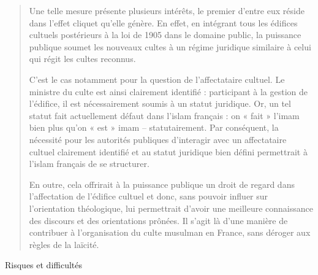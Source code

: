 \begin{quote}
Une telle mesure présente plusieurs intérêts, le premier d'entre eux
réside dans l'effet cliquet qu'elle génère. En effet, en intégrant tous
les édifices cultuels postérieurs à la loi de 1905 dans le domaine
public, la puissance publique soumet les nouveaux cultes à un régime
juridique similaire à celui qui régit les cultes reconnus.

C'est le cas notamment pour la question de l'affectataire cultuel. Le
ministre du culte est ainsi clairement identifié : participant à la
gestion de l'édifice, il est nécessairement soumis à un statut
juridique. Or, un tel statut fait actuellement défaut dans l'islam
français : on « fait » l'imam bien plus qu'on « est » imam --
statutairement. Par conséquent, la nécessité pour les autorités
publiques d'interagir avec un affectataire cultuel clairement identifié
et au statut juridique bien défini permettrait à l'islam français de se
structurer.

En outre, cela offrirait à la puissance publique un droit de regard dans
l'affectation de l'édifice cultuel et donc, sans pouvoir influer sur
l'orientation théologique, lui permettrait d'avoir une meilleure
connaissance des discours et des orientations prônées. Il s'agit là
d'une manière de contribuer à l'organisation du culte musulman en
France, sans déroger aux règles de la laïcité.
\end{quote}

Risques et difficultés

